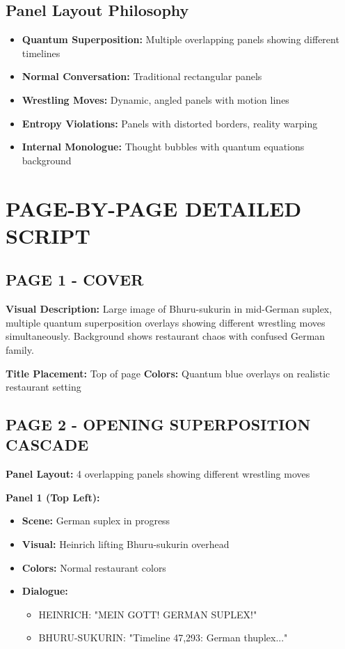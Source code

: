 \documentclass[12pt,a4paper]{article}
\begin{document}
\subsection{Panel Layout Philosophy}
\begin{itemize}
\item \textbf{Quantum Superposition:} Multiple overlapping panels showing different timelines
\item \textbf{Normal Conversation:} Traditional rectangular panels
\item \textbf{Wrestling Moves:} Dynamic, angled panels with motion lines
\item \textbf{Entropy Violations:} Panels with distorted borders, reality warping
\item \textbf{Internal Monologue:} Thought bubbles with quantum equations background
\end{itemize}

\section{PAGE-BY-PAGE DETAILED SCRIPT}

\subsection{PAGE 1 - COVER}
\textbf{Visual Description:}
Large image of Bhuru-sukurin in mid-German suplex, multiple quantum superposition overlays showing different wrestling moves simultaneously. Background shows restaurant chaos with confused German family.

\textbf{Title Placement:} Top of page
\textbf{Colors:} Quantum blue overlays on realistic restaurant setting

\subsection{PAGE 2 - OPENING SUPERPOSITION CASCADE}

\textbf{Panel Layout:} 4 overlapping panels showing different wrestling moves

\textbf{Panel 1 (Top Left):}
\begin{itemize}
\item \textbf{Scene:} German suplex in progress
\item \textbf{Visual:} Heinrich lifting Bhuru-sukurin overhead
\item \textbf{Colors:} Normal restaurant colors
\item \textbf{Dialogue:} 
\begin{itemize}
\item HEINRICH: "MEIN GOTT! GERMAN SUPLEX!"
\item BHURU-SUKURIN: "Timeline 47,293: German thuplex..."
\end{itemize}
\end{itemize}
\end{document}
